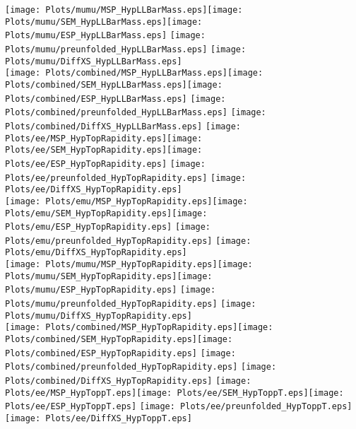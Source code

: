 \documentclass[a4paper,10pt]{article}
\begin{document}
\texttt{[image: Plots/mumu/MSP\_HypLLBarMass.eps]}\texttt{[image: Plots/mumu/SEM\_HypLLBarMass.eps]}\texttt{[image: Plots/mumu/ESP\_HypLLBarMass.eps]} \texttt{[image: Plots/mumu/preunfolded\_HypLLBarMass.eps]} \texttt{[image: Plots/mumu/DiffXS\_HypLLBarMass.eps]}\\
\texttt{[image: Plots/combined/MSP\_HypLLBarMass.eps]}\texttt{[image: Plots/combined/SEM\_HypLLBarMass.eps]}\texttt{[image: Plots/combined/ESP\_HypLLBarMass.eps]} \texttt{[image: Plots/combined/preunfolded\_HypLLBarMass.eps]} \texttt{[image: Plots/combined/DiffXS\_HypLLBarMass.eps]}
\newpage
\texttt{[image: Plots/ee/MSP\_HypTopRapidity.eps]}\texttt{[image: Plots/ee/SEM\_HypTopRapidity.eps]}\texttt{[image: Plots/ee/ESP\_HypTopRapidity.eps]} \texttt{[image: Plots/ee/preunfolded\_HypTopRapidity.eps]} \texttt{[image: Plots/ee/DiffXS\_HypTopRapidity.eps]}\\
\texttt{[image: Plots/emu/MSP\_HypTopRapidity.eps]}\texttt{[image: Plots/emu/SEM\_HypTopRapidity.eps]}\texttt{[image: Plots/emu/ESP\_HypTopRapidity.eps]} \texttt{[image: Plots/emu/preunfolded\_HypTopRapidity.eps]} \texttt{[image: Plots/emu/DiffXS\_HypTopRapidity.eps]}\\
\texttt{[image: Plots/mumu/MSP\_HypTopRapidity.eps]}\texttt{[image: Plots/mumu/SEM\_HypTopRapidity.eps]}\texttt{[image: Plots/mumu/ESP\_HypTopRapidity.eps]} \texttt{[image: Plots/mumu/preunfolded\_HypTopRapidity.eps]} \texttt{[image: Plots/mumu/DiffXS\_HypTopRapidity.eps]}\\
\texttt{[image: Plots/combined/MSP\_HypTopRapidity.eps]}\texttt{[image: Plots/combined/SEM\_HypTopRapidity.eps]}\texttt{[image: Plots/combined/ESP\_HypTopRapidity.eps]} \texttt{[image: Plots/combined/preunfolded\_HypTopRapidity.eps]} \texttt{[image: Plots/combined/DiffXS\_HypTopRapidity.eps]}
\newpage
\texttt{[image: Plots/ee/MSP\_HypToppT.eps]}\texttt{[image: Plots/ee/SEM\_HypToppT.eps]}\texttt{[image: Plots/ee/ESP\_HypToppT.eps]} \texttt{[image: Plots/ee/preunfolded\_HypToppT.eps]} \texttt{[image: Plots/ee/DiffXS\_HypToppT.eps]}\\
\end{document}
